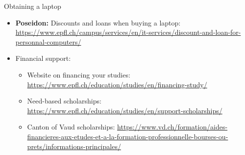 \begin{frame}{Obtaining a laptop}
        \begin{itemize}
                \item \textbf{Poseidon:} \alert{Discounts and loans} when buying a laptop: \linebreak
            {\smaller[2]
            \url{https://www.epfl.ch/campus/services/en/it-services/discount-and-loan-for-personnal-computers/}
            }
        \vspace{0.3em}
        \item \alert{Financial support}:
        \vspace{-0.3em}
        \begin{itemize}
            \item Website on financing your studies: \linebreak
                {\smaller
                \url{https://www.epfl.ch/education/studies/en/financing-study/}
            }
            \vspace{0.3em}
            \item Need-based scholarships: \linebreak
                {\smaller
                \url{https://www.epfl.ch/education/studies/en/support-scholarships/}}
            \vspace{-0.7em}
            \item Canton of Vaud scholarships:
                {\smaller \url{https://www.vd.ch/formation/aides-financieres-aux-etudes-et-a-la-formation-professionnelle-bourses-ou-prets/informations-principales/}}
        \end{itemize}
    \end{itemize}
\end{frame}


